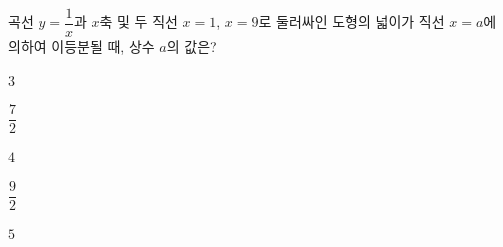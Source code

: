 \hspace*{2mm}\begin{minipage}[t]{\dimexpr\linewidth-2mm\relax}\vspace{0pt}
곡선 $y=\dfrac{1}{x}$과 $x$축 및 두 직선 $x=1$, $x=9$로 둘러싸인 도형의 넓이가 직선 $x=a$에 의하여 이등분될 때, 상수 $a$의 값은? 
\begin{choices32}{\rule[-3ex]{0pt}{8ex}$3$}{\rule[-3ex]{0pt}{8ex}$\dfrac{7}{2}$}{\rule[-3ex]{0pt}{8ex}$4$}{\rule[-3ex]{0pt}{8ex}$\dfrac{9}{2}$}{\rule[-3ex]{0pt}{8ex}$5$}\end{choices32}\end{minipage}
